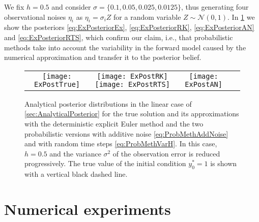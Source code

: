 \documentclass[10pt]{article}
\begin{document}
We fix $h = 0.5$ and consider $\sigma = \{0.1, 0.05, 0.025, 0.0125\}$, thus generating four observational noises $\eta_i$ as $\eta_i = \sigma_i Z$ for a random variable $Z \sim \mathcal{N}(0, 1)$. In \cref{fig:AnalyticalPosterior} we show the posteriors \eqref{eq:ExPosteriorEx}, \eqref{eq:ExPosteriorRK}, \eqref{eq:ExPosteriorAN} and \eqref{eq:ExPosteriorRTS}, which confirm our claim, i.e., that probabilistic methods take into account the variability in the forward model caused by the numerical approximation and transfer it to the posterior belief.

\begin{figure}
	\begin{center}
		
		\vspace{0.2cm}
		\begin{tabular}{cccc}
		\texttt{[image: ExPostTrue]} & \texttt{[image: ExPostRK]} \texttt{[image: ExPostRTS]} &	\texttt{[image: ExPostAN]}
		\end{tabular}	
	\end{center}
	\caption{Analytical posterior distributions in the linear case of \cref{sec:AnalyticalPosterior} for the true solution and its approximations with the deterministic explicit Euler method and the two probabilistic versions with additive noise \eqref{eq:ProbMethAddNoise} and with random time steps \eqref{eq:ProbMethVarH}. In this case, $h = 0.5$ and the variance $\sigma^2$ of the observation error is reduced progressively. The true value of the initial condition $y_0^* = 1$ is shown with a vertical black dashed line.}
	\label{fig:AnalyticalPosterior}
\end{figure}

\section{Numerical experiments}\label{sec:NumericalExperiments}
\end{document}
